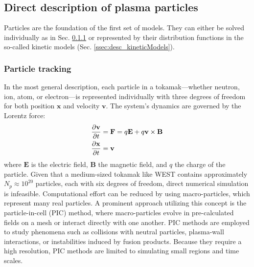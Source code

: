 \subsection{Direct description of plasma particles}
\label{sec:desc_directDesciption}
Particles are the foundation of the first set of models. They can either be solved individually as in Sec. \ref{ssec:desc_particleTracking} or represented by their distribution functions in the so-called kinetic models (Sec. \ref{ssec:desc_kineticModels}).

\subsubsection{Particle tracking}
\label{ssec:desc_particleTracking}
In the most general description, each particle in a tokamak—whether neutron, ion, atom, or electron—is represented individually with three degrees of freedom for both position $\mathbf{x}$ and velocity $\mathbf{v}$. The system's dynamics are governed by the Lorentz force:
\begin{align}
	\pdv{\mathbf{v}}{t} &= \mathbf{F} = q\mathbf{E} + q\mathbf{v} \times \mathbf{B} \label{eq:desc_particle}\\
	\pdv{\mathbf{x}}{t} &= \mathbf{v}
\end{align}
where $\mathbf{E}$ is the electric field, $\mathbf{B}$ the magnetic field, and $q$ the charge of the particle. \newline
Given that a medium-sized tokamak like WEST contains approximately $N_p \approx 10^{20}$ particles, each with six degrees of freedom, direct numerical simulation is infeasible. Computational effort can be reduced by using macro-particles, which represent many real particles. A prominent approach utilizing this concept is the particle-in-cell (PIC) method\cite{tskhakaya2007particle}, where macro-particles evolve in pre-calculated fields on a mesh or interact directly with one another. PIC methods are employed to study phenomena such as collisions with neutral particles\cite{birdsall1991particle}, plasma-wall interactions\cite{khaziev2018hpic}, or instabilities induced by fusion products\cite{cook2013particle}. Because they require a high resolution, PIC methods are limited to simulating small regions and time scales.



